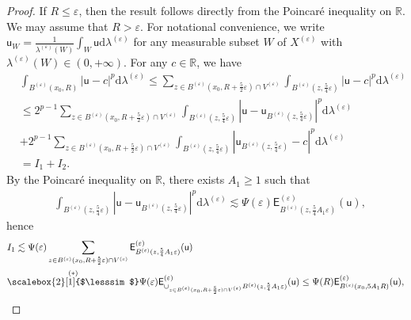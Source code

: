 \documentclass[11pt,a4paper]{article}
\numberwithin{equation}{section}
\theoremstyle{plain}
\theoremstyle{definition}
\begin{document}
\begin{proof}
If $R\le\varepsilon$, then the result follows directly from the Poincar\'e inequality on $\mathbb{R}$. We may assume that $R>\varepsilon$. For notational convenience, we write $\mathsf{u}_{W}=\frac{1}{\lambda^{(\varepsilon)}(W)}\int_{W}\mathsf{u}\mathrm{d}\lambda^{(\varepsilon)}$ for any measurable subset $W$ of $X^{(\varepsilon)}$ with $\lambda^{(\varepsilon)}(W)\in(0,+\infty)$. For any $c\in \mathbb{R}$, we have
\begin{align*}
&\int_{B^{(\varepsilon)}(x_0,R)}\lvert \mathsf{u}-c\rvert^p\mathrm{d}\lambda^{(\varepsilon)}\le\sum_{z\in B^{(\varepsilon)}(x_0,R+\frac{5}{2}\varepsilon)\cap V^{(\varepsilon)}}\int_{B^{(\varepsilon)}(z,\frac{5}{4}\varepsilon)}|\mathsf{u}-c|^p\mathrm{d}\lambda^{(\varepsilon)}\\
&\le2^{p-1}\sum_{z\in B^{(\varepsilon)}(x_0,R+\frac{5}{2}\varepsilon)\cap V^{(\varepsilon)}}\int_{B^{(\varepsilon)}(z,\frac{5}{4}\varepsilon)}|\mathsf{u}-\mathsf{u}_{B^{(\varepsilon)}(z,\frac{5}{4}\varepsilon)}|^p\mathrm{d}\lambda^{(\varepsilon)}\\
&+2^{p-1}\sum_{z\in B^{(\varepsilon)}(x_0,R+\frac{5}{2}\varepsilon)\cap V^{(\varepsilon)}}\int_{B^{(\varepsilon)}(z,\frac{5}{4}\varepsilon)}|\mathsf{u}_{B^{(\varepsilon)}(z,\frac{5}{4}\varepsilon)}-c|^p\mathrm{d}\lambda^{(\varepsilon)}\\
&=I_1+I_2.
\end{align*}
By the Poincar\'e inequality on $\mathbb{R}$, there exists $A_1\ge1$ such that
\begin{align*}
&\int_{B^{(\varepsilon)}(z,\frac{5}{4}\varepsilon)}|\mathsf{u}-\mathsf{u}_{B^{(\varepsilon)}(z,\frac{5}{4}\varepsilon)}|^p\mathrm{d}\lambda^{(\varepsilon)}\lesssim \Psi(\varepsilon)\mathsf{E}^{(\varepsilon)}_{{B^{(\varepsilon)}(z,\frac{5}{4}A_1\varepsilon)}}(\mathsf{u}),
\end{align*}
hence
\begin{align*}
&I_1\lesssim \Psi(\varepsilon)\sum_{z\in B^{(\varepsilon)}(x_0,R+\frac{5}{2}\varepsilon)\cap V^{(\varepsilon)}}\mathsf{E}^{(\varepsilon)}_{{B^{(\varepsilon)}(z,\frac{5}{4}A_1\varepsilon)}}(\mathsf{u})\\
&\overset{(*)}{\scalebox{2}[1]{$\lesssim$}}\Psi(\varepsilon)\mathsf{E}^{(\varepsilon)}_{\cup_{z\in B^{(\varepsilon)}(x_0,R+\frac{5}{2}\varepsilon)\cap V^{(\varepsilon)}}{B^{(\varepsilon)}(z,\frac{5}{4}A_1\varepsilon)}}(\mathsf{u})\le \Psi(R)\mathsf{E}^{(\varepsilon)}_{{B^{(\varepsilon)}(x_0,5A_1R)}}(\mathsf{u}),
\end{align*}

\end{proof}
\end{document}
